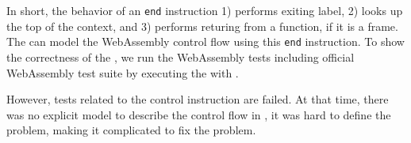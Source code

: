 In short, the behavior of an \texttt{end} instruction 1) performs exiting
label, 2) looks up the top of the context, and 3) performs returing from a
function, if it is a frame.
The \spectecp{} can model the WebAssembly control flow using this \texttt{end}
instruction.
To show the correctness of the \spectecp{}, we run the WebAssembly tests
including official WebAssembly test suite by executing the \spectecp{} with
.


However, tests related to the control instruction are failed.
At that time, there was no explicit model to describe the control flow in
\spectecp{}, it was hard to define the problem, making it complicated to fix
the problem.
